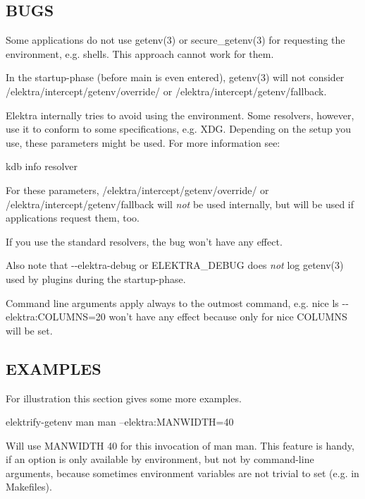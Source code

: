 \subsection*{B\+U\+G\+S}

Some applications do not use {\ttfamily getenv(3)} or {\ttfamily secure\+\_\+getenv(3)} for requesting the environment, e.\+g. shells. This approach cannot work for them.

In the startup-\/phase (before main is even entered), {\ttfamily getenv(3)} will not consider {\ttfamily /elektra/intercept/getenv/override/} or {\ttfamily /elektra/intercept/getenv/fallback}.

Elektra internally tries to avoid using the environment. Some resolvers, however, use it to conform to some specifications, e.\+g. X\+D\+G. Depending on the setup you use, these parameters might be used. For more information see\+: \begin{DoxyVerb}kdb info resolver
\end{DoxyVerb}


For these parameters, {\ttfamily /elektra/intercept/getenv/override/} or {\ttfamily /elektra/intercept/getenv/fallback} will {\itshape not} be used internally, but will be used if applications request them, too.

If you use the standard resolvers, the bug won't have any effect.

Also note that {\ttfamily -\/-\/elektra-\/debug} or {\ttfamily E\+L\+E\+K\+T\+R\+A\+\_\+\+D\+E\+B\+U\+G} does {\itshape not} log {\ttfamily getenv(3)} used by plugins during the startup-\/phase.

Command line arguments apply always to the outmost command, e.\+g. {\ttfamily nice ls -\/-\/elektra\+:C\+O\+L\+U\+M\+N\+S=20} won't have any effect because only for {\ttfamily nice} {\ttfamily C\+O\+L\+U\+M\+N\+S} will be set.

\subsection*{E\+X\+A\+M\+P\+L\+E\+S}

For illustration this section gives some more examples. \begin{DoxyVerb}elektrify-getenv man man --elektra:MANWIDTH=40
\end{DoxyVerb}


Will use M\+A\+N\+W\+I\+D\+T\+H 40 for this invocation of man man. This feature is handy, if an option is only available by environment, but not by command-\/line arguments, because sometimes environment variables are not trivial to set (e.\+g. in Makefiles).

